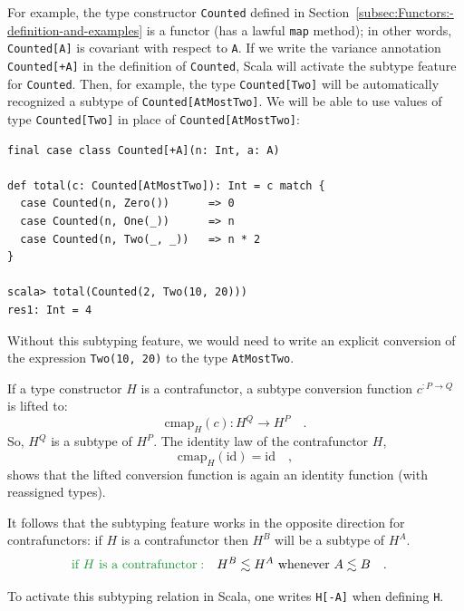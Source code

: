 For example, the type constructor \lstinline!Counted! defined in
Section~\ref{subsec:Functors:-definition-and-examples} is a functor
(has a lawful \lstinline!map! method); in other words, \lstinline!Counted[A]!
is covariant with respect to \lstinline!A!. If we write the variance
annotation \lstinline!Counted[+A]! in the definition of \lstinline!Counted!,
Scala will activate the subtype feature for \lstinline!Counted!.
Then, for example, the type \lstinline!Counted[Two]! will be automatically
recognized a subtype of \lstinline!Counted[AtMostTwo]!. We will be
able to use values of type \lstinline!Counted[Two]! in place of \lstinline!Counted[AtMostTwo]!:
\begin{lstlisting}
final case class Counted[+A](n: Int, a: A)

def total(c: Counted[AtMostTwo]): Int = c match {
  case Counted(n, Zero())      => 0
  case Counted(n, One(_))      => n
  case Counted(n, Two(_, _))   => n * 2
}

scala> total(Counted(2, Two(10, 20)))
res1: Int = 4
\end{lstlisting}
Without this subtyping feature, we would need to write an explicit
conversion of the expression \lstinline!Two(10, 20)! to the type
\lstinline!AtMostTwo!.

If a type constructor $H$ is a contrafunctor, a subtype conversion
function $c^{:P\rightarrow Q}$ is lifted to:
\[
\text{cmap}_{H}(c):H^{Q}\rightarrow H^{P}\quad.
\]
So,  $H^{Q}$ is a subtype of $H^{P}$. The identity law of the contrafunctor
$H$,
\[
\text{cmap}_{H}(\text{id})=\text{id}\quad,
\]
shows that the lifted conversion function is again an identity function
(with reassigned types).

It follows that the subtyping feature works in the opposite direction
for contrafunctors: if $H$ is a contrafunctor then $H^{B}$ will
be a subtype of $H^{A}$.
\begin{align*}
{\color{greenunder}\text{if }H\text{ is a contrafunctor}:}\quad & H^{B}\lesssim H^{A}\text{ whenever }A\lesssim B\quad.
\end{align*}

To activate this subtyping relation in Scala, one writes \lstinline!H[-A]!
when defining \lstinline!H!.

